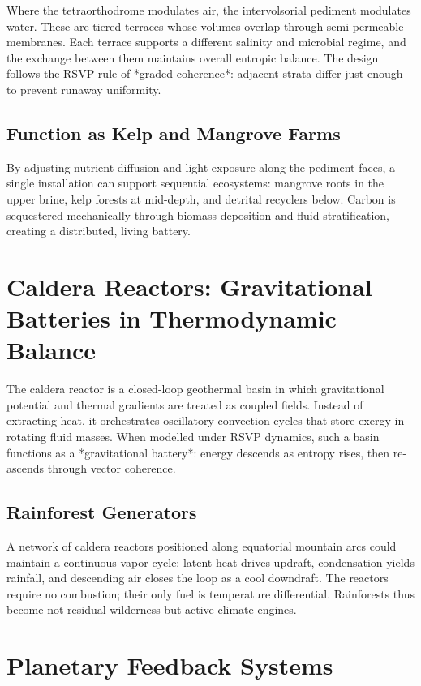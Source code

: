 \documentclass[12pt]{article}
\begin{document}
Where the tetraorthodrome modulates air, the intervolsorial pediment modulates water.
These are tiered terraces whose volumes overlap through semi-permeable membranes.
Each terrace supports a different salinity and microbial regime,
and the exchange between them maintains overall entropic balance.
The design follows the RSVP rule of *graded coherence*:
adjacent strata differ just enough to prevent runaway uniformity.

\subsection*{Function as Kelp and Mangrove Farms}

By adjusting nutrient diffusion and light exposure along the pediment faces,
a single installation can support sequential ecosystems:
mangrove roots in the upper brine,
kelp forests at mid-depth,
and detrital recyclers below.
Carbon is sequestered mechanically through
biomass deposition and fluid stratification,
creating a distributed, living battery.

\section{Caldera Reactors: Gravitational Batteries in Thermodynamic Balance}

The caldera reactor is a closed-loop geothermal basin in which
gravitational potential and thermal gradients are treated as coupled fields.
Instead of extracting heat, it orchestrates
oscillatory convection cycles that
store exergy in rotating fluid masses.
When modelled under RSVP dynamics, such a basin functions as a *gravitational battery*:
energy descends as entropy rises, then re-ascends through vector coherence.

\subsection*{Rainforest Generators}

A network of caldera reactors positioned along equatorial mountain arcs
could maintain a continuous vapor cycle:
latent heat drives updraft,
condensation yields rainfall,
and descending air closes the loop as a cool downdraft.
The reactors require no combustion; their only fuel is temperature differential.
Rainforests thus become not residual wilderness but active climate engines.

\section{Planetary Feedback Systems}
\end{document}
